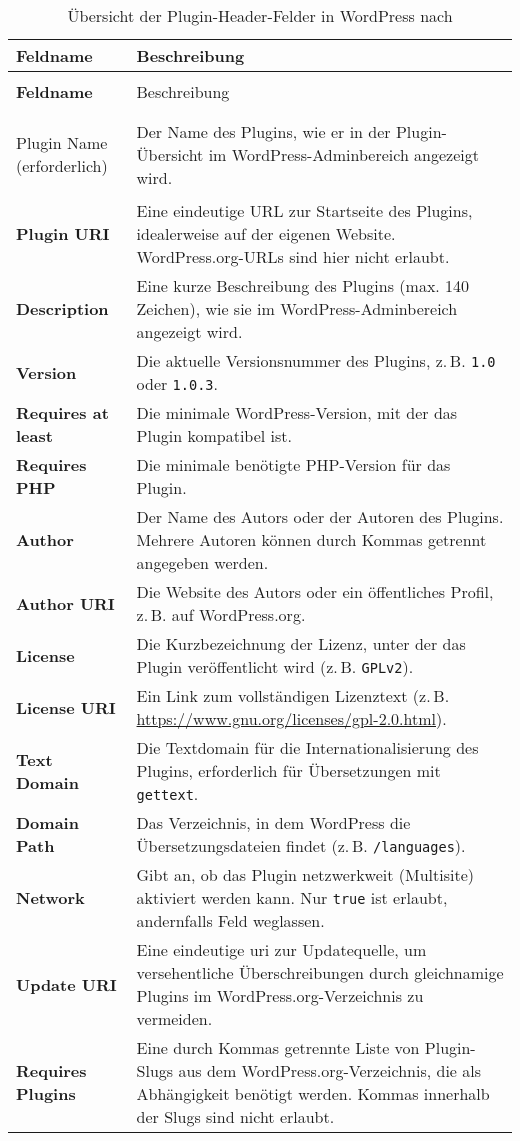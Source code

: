 \begin{longtable}{>{\bfseries}p{4cm} p{10cm}}
 \caption{Übersicht der Plugin-Header-Felder in WordPress nach \cite{WPHeaderReq}} \\
 \hline
 Feldname & Beschreibung \\
 \hline
 \endfirsthead

 \multicolumn{2}{l}{\textit{Fortsetzung von vorheriger Seite}} \\
 \hline
 Feldname & Beschreibung \\
 \hline
 \endhead

 \hline
 \multicolumn{2}{r}{\textit{Fortsetzung auf nächster Seite}} \\
 \endfoot

 \hline
 \endlastfoot

 Plugin Name (erforderlich) & Der Name des Plugins, wie er in der Plugin-Übersicht im WordPress-Adminbereich angezeigt wird. \\
 Plugin URI & Eine eindeutige URL zur Startseite des Plugins, idealerweise auf der eigenen Website. WordPress.org-URLs sind hier nicht erlaubt. \\
 Description & Eine kurze Beschreibung des Plugins (max. 140 Zeichen), wie sie im WordPress-Adminbereich angezeigt wird. \\
 Version & Die aktuelle Versionsnummer des Plugins, z.\,B. \texttt{1.0} oder \texttt{1.0.3}. \\
 Requires at least & Die minimale WordPress-Version, mit der das Plugin kompatibel ist. \\
 Requires PHP & Die minimale benötigte PHP-Version für das Plugin. \\
 Author & Der Name des Autors oder der Autoren des Plugins. Mehrere Autoren können durch Kommas getrennt angegeben werden. \\
 Author URI & Die Website des Autors oder ein öffentliches Profil, z.\,B. auf WordPress.org. \\
 License & Die Kurzbezeichnung der Lizenz, unter der das Plugin veröffentlicht wird (z.\,B. \texttt{GPLv2}). \\
 License URI & Ein Link zum vollständigen Lizenztext (z.\,B. \url{https://www.gnu.org/licenses/gpl-2.0.html}). \\
 Text Domain & Die Textdomain für die Internationalisierung des Plugins, erforderlich für Übersetzungen mit \texttt{gettext}. \\
 Domain Path & Das Verzeichnis, in dem WordPress die Übersetzungsdateien findet (z.\,B. \texttt{/languages}). \\
 Network & Gibt an, ob das Plugin netzwerkweit (Multisite) aktiviert werden kann. Nur \texttt{true} ist erlaubt, andernfalls Feld weglassen. \\
 Update URI & Eine eindeutige \gls{uri} zur Updatequelle, um versehentliche Überschreibungen durch gleichnamige Plugins im WordPress.org-Verzeichnis zu vermeiden. \\
 Requires Plugins & Eine durch Kommas getrennte Liste von Plugin-Slugs aus dem WordPress.org-Verzeichnis, die als Abhängigkeit benötigt werden. Kommas innerhalb der Slugs sind nicht erlaubt. \\
\end{longtable}

